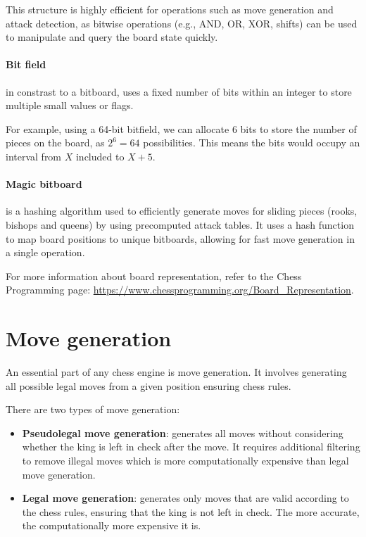 \noindent This structure is highly efficient for operations such as move generation and attack detection, as bitwise operations (e.g., AND, OR, XOR, shifts) can be used to manipulate and query the board state quickly.

\paragraph{Bit field} in constrast to a bitboard, uses a fixed number of bits within an integer to store multiple small values or flags.

\vspace{1em}

\noindent For example, using a 64-bit bitfield, we can allocate 6 bits to store the number of pieces on the board, as $2^6 = 64$ possibilities. This means the bits would occupy an interval from $X$ included to $X+5$.

\paragraph{Magic bitboard} is a hashing algorithm used to efficiently generate moves for sliding pieces (rooks, bishops and queens) by using precomputed attack tables. It uses a hash function to map board positions to unique bitboards, allowing for fast move generation in a single operation.

\vspace{1em}

\noindent For more information about board representation, refer to the Chess Programming page: \url{https://www.chessprogramming.org/Board_Representation}.

\section{Move generation}
\label{sec:move-generation}

An essential part of any chess engine is move generation. It involves generating all possible legal moves from a given position ensuring chess rules.

\vspace{1em}

\noindent There are two types of move generation:

\begin{itemize}
    \item \textbf{Pseudolegal move generation}: generates all moves without considering whether the king is left in check after the move. It requires additional filtering to remove illegal moves which is more computationally expensive than legal move generation.
    \item \textbf{Legal move generation}: generates only moves that are valid according to the chess rules, ensuring that the king is not left in check. The more accurate, the computationally more expensive it is.
\end{itemize}

